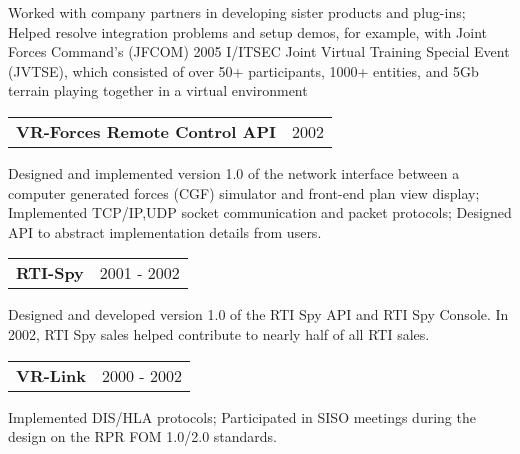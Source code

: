 Worked with company partners in developing sister products and plug-ins; Helped resolve integration problems and setup demos, for example, with Joint Forces Command's (JFCOM) 2005 I/ITSEC Joint Virtual Training Special Event (JVTSE), which consisted of over 50+ participants, 1000+ entities, and 5Gb terrain playing together in a virtual environment
\medskip

\needspace{6em}
\begin{tabular*}{7.1in}{@{}l@{\extracolsep\fill}r}
{\bf VR-Forces Remote Control API} & 2002\\
\end{tabular*}
Designed and implemented version 1.0 of the network interface between a computer generated forces (CGF) simulator and front-end plan view display; Implemented TCP/IP,UDP socket communication and packet protocols; Designed API to abstract implementation details from users.
\medskip

\needspace{6em}
\begin{tabular*}{7.1in}{@{}l@{\extracolsep\fill}r}
{\bf RTI-Spy} & 2001 - 2002\\
\end{tabular*}
Designed and developed version 1.0 of the RTI Spy API and RTI Spy Console.  In 2002, RTI Spy sales helped contribute to nearly half of all RTI sales.
\medskip

\needspace{6em}
\begin{tabular*}{7.1in}{@{}l@{\extracolsep\fill}r}
{\bf VR-Link} & 2000 - 2002\\
\end{tabular*}
Implemented DIS/HLA protocols; Participated in SISO meetings during the design on the RPR FOM 1.0/2.0 standards.


